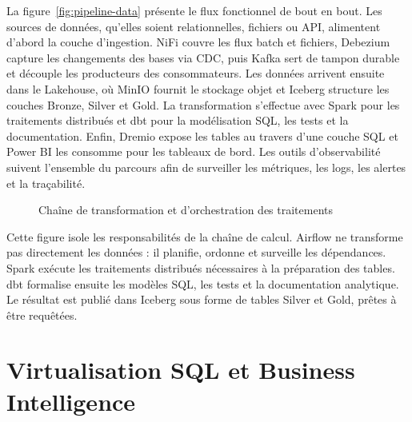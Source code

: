 La figure~\ref{fig:pipeline-data} présente le flux fonctionnel de bout en bout. Les sources de données, qu'elles soient relationnelles, fichiers ou API, alimentent d'abord la couche d'ingestion. NiFi couvre les flux batch et fichiers, Debezium capture les changements des bases via CDC, puis Kafka sert de tampon durable et découple les producteurs des consommateurs. Les données arrivent ensuite dans le Lakehouse, où MinIO fournit le stockage objet et Iceberg structure les couches Bronze, Silver et Gold. La transformation s'effectue avec Spark pour les traitements distribués et dbt pour la modélisation SQL, les tests et la documentation. Enfin, Dremio expose les tables au travers d'une couche SQL et Power BI les consomme pour les tableaux de bord. Les outils d'observabilité suivent l'ensemble du parcours afin de surveiller les métriques, les logs, les alertes et la traçabilité.

\begin{figure}[H]
\centering
{}
\caption{Chaîne de transformation et d'orchestration des traitements}
\label{fig:transformation-orchestration}
\end{figure}

Cette figure isole les responsabilités de la chaîne de calcul. Airflow ne transforme pas directement les données : il planifie, ordonne et surveille les dépendances. Spark exécute les traitements distribués nécessaires à la préparation des tables. dbt formalise ensuite les modèles SQL, les tests et la documentation analytique. Le résultat est publié dans Iceberg sous forme de tables Silver et Gold, prêtes à être requêtées.

\section{Virtualisation SQL et Business Intelligence}

